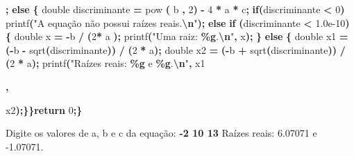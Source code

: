 \documentclass[
  11pt,
  a4paper,
]{scrbook}
\newenvironment{Shaded}{\begin{snugshade}}{\end{snugshade}}
\newcommand{\ControlFlowTok}[1]{\textcolor[rgb]{0.13,0.29,0.53}{\textbf{#1}}}
\newcommand{\DataTypeTok}[1]{\textcolor[rgb]{0.13,0.29,0.53}{#1}}
\newcommand{\DecValTok}[1]{\textcolor[rgb]{0.00,0.00,0.81}{#1}}
\newcommand{\FloatTok}[1]{\textcolor[rgb]{0.00,0.00,0.81}{#1}}
\newcommand{\KeywordTok}[1]{\textcolor[rgb]{0.13,0.29,0.53}{\textbf{#1}}}
\newcommand{\NormalTok}[1]{#1}
\newcommand{\OperatorTok}[1]{\textcolor[rgb]{0.81,0.36,0.00}{\textbf{#1}}}
\newcommand{\SpecialCharTok}[1]{\textcolor[rgb]{0.81,0.36,0.00}{\textbf{#1}}}
\newcommand{\StringTok}[1]{\textcolor[rgb]{0.31,0.60,0.02}{#1}}
\begin{document}
\begin{Shaded}
\begin{Highlighting}[]
\OperatorTok{;} \ControlFlowTok{else} \OperatorTok{\{} \DataTypeTok{double}\NormalTok{ discriminante }\OperatorTok{=}\NormalTok{ pow}
\OperatorTok{(}
\NormalTok{b}
                                                                             \OperatorTok{,}
\DecValTok{2}\OperatorTok{)} \OperatorTok{{-}} \DecValTok{4} \OperatorTok{*}\NormalTok{ a }\OperatorTok{*}\NormalTok{ c}\OperatorTok{;} \ControlFlowTok{if}\OperatorTok{(}\NormalTok{discriminante }\OperatorTok{\textless{}}
\DecValTok{0}\OperatorTok{)}\NormalTok{ printf}\OperatorTok{(}\StringTok{"A equação não possui raízes reais.}\SpecialCharTok{\textbackslash{}n}\StringTok{"}\OperatorTok{);}
\ControlFlowTok{else}
\ControlFlowTok{if}
\OperatorTok{(}\NormalTok{discriminante }\OperatorTok{\textless{}} \FloatTok{1.0e{-}10}\OperatorTok{)} \OperatorTok{\{}  \DataTypeTok{double}\NormalTok{ x }\OperatorTok{=} \OperatorTok{{-}}\NormalTok{b }\OperatorTok{/} \OperatorTok{(}\DecValTok{2}\OperatorTok{*}\NormalTok{    a}
            \OperatorTok{);}\NormalTok{ printf}\OperatorTok{(}\StringTok{"Uma raiz: }\SpecialCharTok{\%g}\StringTok{.}\SpecialCharTok{\textbackslash{}n}\StringTok{"}\OperatorTok{,}\NormalTok{ x}\OperatorTok{);} \OperatorTok{\}} \ControlFlowTok{else} \OperatorTok{\{} \DataTypeTok{double}\NormalTok{ x1 }\OperatorTok{=} \OperatorTok{({-}}\NormalTok{b }\OperatorTok{{-}}
\NormalTok{            sqrt}\OperatorTok{(}\NormalTok{discriminante}\OperatorTok{))} \OperatorTok{/} \OperatorTok{(}\DecValTok{2} \OperatorTok{*}\NormalTok{ a}\OperatorTok{);} \DataTypeTok{double}\NormalTok{ x2 }\OperatorTok{=} \OperatorTok{({-}}\NormalTok{b }\OperatorTok{+} 
\NormalTok{sqrt}\OperatorTok{(}\NormalTok{discriminante}\OperatorTok{))}
            \OperatorTok{/} \OperatorTok{(}\DecValTok{2} \OperatorTok{*}\NormalTok{ a}\OperatorTok{);}\NormalTok{ printf}\OperatorTok{(}\StringTok{"Raízes reais: }\SpecialCharTok{\%g}\StringTok{ e }\SpecialCharTok{\%g}\StringTok{.}\SpecialCharTok{\textbackslash{}n}\StringTok{"}\OperatorTok{,}\NormalTok{ x1}

\OperatorTok{,}
 
\NormalTok{ x2}\OperatorTok{);\}\}}\ControlFlowTok{return}
 \DecValTok{0}\OperatorTok{;\}}
\end{Highlighting}
\end{Shaded}

\begin{Shaded}
\begin{Highlighting}[]
\NormalTok{Digite os valores de a, b e c da equação: }\KeywordTok{ {-}2 10 13 }
\NormalTok{Raízes reais: 6.07071 e {-}1.07071.}
\end{Highlighting}
\end{Shaded}
\end{document}

